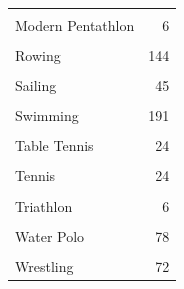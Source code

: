 \documentclass[
]{article}
\begin{document}
\begin{table}
\begin{tabular}[t]{lr}
\cellcolor{gray!10}{Judo} & \cellcolor{gray!10}{56}\\
Modern Pentathlon & 6\\
\cellcolor{gray!10}{Rhythmic Gymnastics} & \cellcolor{gray!10}{18}\\
Rowing & 144\\
\addlinespace
\cellcolor{gray!10}{Rugby Sevens} & \cellcolor{gray!10}{74}\\
Sailing & 45\\
\cellcolor{gray!10}{Shooting} & \cellcolor{gray!10}{45}\\
Swimming & 191\\
\cellcolor{gray!10}{Synchronized Swimming} & \cellcolor{gray!10}{32}\\
\addlinespace
Table Tennis & 24\\
\cellcolor{gray!10}{Taekwondo} & \cellcolor{gray!10}{32}\\
Tennis & 24\\
\cellcolor{gray!10}{Trampolining} & \cellcolor{gray!10}{6}\\
Triathlon & 6\\
\addlinespace
\cellcolor{gray!10}{Volleyball} & \cellcolor{gray!10}{72}\\
Water Polo & 78\\
\cellcolor{gray!10}{Weightlifting} & \cellcolor{gray!10}{45}\\
Wrestling & 72\\
\bottomrule
\end{tabular}
\end{table}
\newpage
\end{document}
